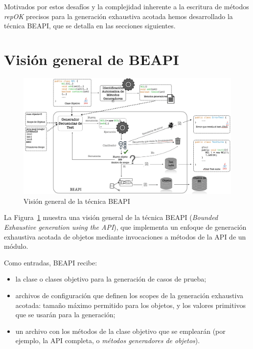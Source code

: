 Motivados por estos desafíos y la complejidad inherente a la escritura de
métodos \emph{repOK} precisos para la generación exhaustiva acotada hemos
desarrollado la técnica BEAPI, que se detalla en las secciones siguientes.


\section{Visión general de BEAPI}
\label{sec:beapi-overview}

\begin{figure}[H]
  \centering
  \includegraphics[width=1.0\textwidth]{images/beapi-arquitecture.jpeg}
  \caption{Visión general de la técnica \textsf{BEAPI}}
  \label{fig:beapi-overview}
\end{figure}

La Figura~\ref{fig:beapi-overview} muestra una visión general de la técnica 
\textsf{BEAPI} (\emph{Bounded Exhaustive generation using the API}), que implementa un enfoque 
de generación exhaustiva acotada de objetos mediante invocaciones a métodos de
la API de un módulo. 

Como entradas, \textsf{BEAPI} recibe:
\begin{itemize}
    \item la clase o clases objetivo para la generación de casos de prueba;
    \item archivos de configuración que definen los scopes de la generación
        exhaustiva acotada: tamaño máximo permitido para los objetos, y los valores primitivos 
        que se usarán para la generación;
    \item un archivo con los métodos de la clase objetivo que se emplearán 
        (por ejemplo, la API completa, o \emph{métodos generadores de objetos}).
\end{itemize}

